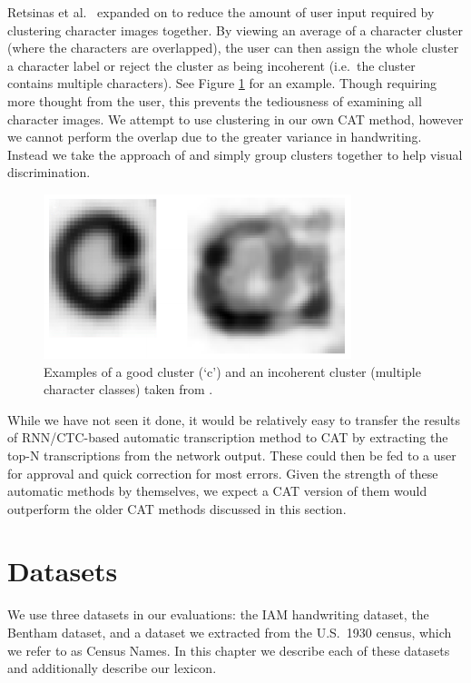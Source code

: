 \documentclass[ms,electronic,twosidetoc,letterpaper,chaptercenter,parttop,lof,lot]{byumsphd}
\begin{document}
Retsinas et al.~\cite{Retsinas2015} expanded on \cite{Neudecker2010} to reduce the amount of user input required by clustering character images together. By viewing an average of a character cluster (where the characters are overlapped), the user can then assign the whole cluster a character label or reject the cluster as being incoherent (i.e.~the cluster contains multiple characters). See Figure \ref{fig:retsinas_ex} for an example. Though requiring more thought from the user, this prevents the tediousness of examining all character images. %
We attempt to use clustering in our own CAT method, however we cannot perform the overlap due to the greater variance in handwriting. Instead we take the approach of \cite{Clawson2014} and simply group clusters together to help visual discrimination.

\begin{figure}
    \centering
    \includegraphics[width=.4\textwidth]{retsinas_ex}
    \caption{Examples of a good cluster (`c') and an incoherent cluster (multiple character classes) taken from \cite{Retsinas2015}.}
    \label{fig:retsinas_ex}
\end{figure}

While we have not seen it done, it would be relatively easy to transfer the results of RNN/CTC-based automatic transcription method to CAT by extracting the top-N transcriptions from the network output. These could then be fed to a user for approval and quick correction for most errors. Given the strength of these automatic methods by themselves, we expect a CAT version of them would outperform the older CAT methods discussed in this section. 



\chapter{Datasets}\label{datasets}

We use three datasets in our evaluations: the IAM handwriting dataset, the Bentham dataset, and a dataset we extracted from the U.S.~1930 census, which we refer to as Census Names. In this chapter we describe each of these datasets and additionally describe our lexicon.
\end{document}
